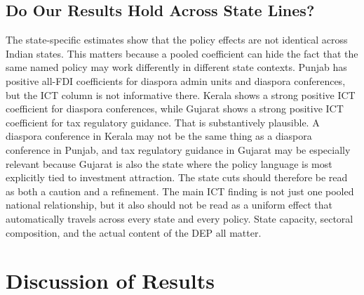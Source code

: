 \documentclass[doublespace,nopageskip]{UVAthesis}
\begin{document}
\FloatBarrier
\section{Do Our Results Hold Across State Lines?} \label{ss:state lines}



The state-specific estimates show that the policy effects are not identical across Indian states. This matters because a pooled coefficient can hide the fact that the same named policy may work differently in different state contexts. Punjab has positive all-FDI coefficients for diaspora admin units and diaspora conferences, but the ICT column is not informative there. Kerala shows a strong positive ICT coefficient for diaspora conferences, while Gujarat shows a strong positive ICT coefficient for tax regulatory guidance. That is substantively plausible. A diaspora conference in Kerala may not be the same thing as a diaspora conference in Punjab, and tax regulatory guidance in Gujarat may be especially relevant because Gujarat is also the state where the policy language is most explicitly tied to investment attraction. The state cuts should therefore be read as both a caution and a refinement. The main ICT finding is not just one pooled national relationship, but it also should not be read as a uniform effect that automatically travels across every state and every policy. State capacity, sectoral composition, and the actual content of the DEP all matter.

\chapter{Discussion of Results} \label{ch: discussion of results}
\end{document}
